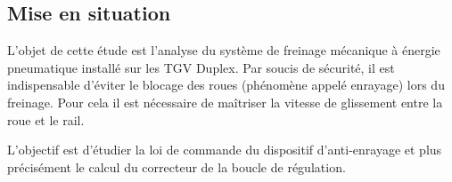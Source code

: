 \else
\begin{multicols}{2}
\fi
\section*{Mise en situation}

\ifprof
\else
L’objet de cette étude est l’analyse du système de freinage mécanique à énergie
pneumatique installé sur les TGV Duplex. Par soucis de sécurité, il est indispensable d'éviter le blocage des roues (phénomène appelé enrayage) lors du freinage. Pour cela il est nécessaire de maîtriser la vitesse de glissement entre la roue et le rail.
\begin{obj}
L’objectif est d'étudier la loi de commande du dispositif d’anti-enrayage et plus précisément le calcul du correcteur de la boucle de régulation.
\end{obj}






\end{multicols}
